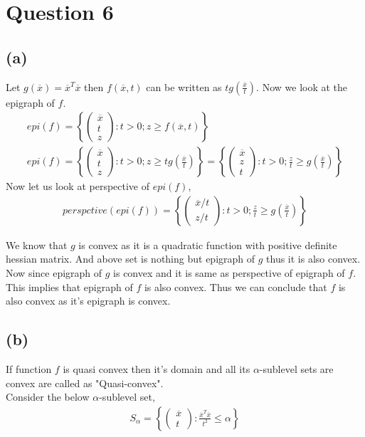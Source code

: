 \documentclass{article}
\begin{document}
\section*{\hfil Question 6}
\subsection*{(a)}
Let $g(\overline{x}) = \overline{x}^T\overline{x}$ then $f(\overline{x}, t)$ can be written as $tg(\frac{\overline{x}}{t})$. Now we look at the epigraph of $f$.
\begin{gather*}
	epi(f) = \left\{\begin{pmatrix}
	\overline{x}\\
	t\\
	z
	\end{pmatrix} : t > 0; z \ge f(\overline{x}, t)\right\}\\
	epi(f) = \left\{\begin{pmatrix}
	\overline{x}\\
	t\\
	z
	\end{pmatrix} : t > 0; z \ge tg\left(\frac{\overline{x}}{t}\right)\right\} = \left\{\begin{pmatrix}
	\overline{x}\\
	z\\
	t
	\end{pmatrix} : t > 0; \frac{z}{t} \ge g\left(\frac{\overline{x}}{t}\right)\right\}
\end{gather*}
Now let us look at perspective of $epi(f)$,
\begin{gather*}
perspctive(epi(f)) = \left\{\begin{pmatrix}
	\overline{x}/t\\
	z/t
	\end{pmatrix} : t > 0; \frac{z}{t} \ge g\left(\frac{\overline{x}}{t}\right)\right\}
\end{gather*}

We know that $g$ is convex as it is a quadratic function with positive definite hessian matrix. And above set is nothing but epigraph of $g$ thus it is also convex. Now since epigraph of $g$ is convex and it is same as perspective of epigraph of $f$. This implies that epigraph of $f$ is also convex. Thus we can conclude that $f$ is also convex as it's epigraph is convex.
\subsection*{(b)}
If function $f$ is quasi convex then it's domain and all its $\alpha$-sublevel sets are convex are called as "Quasi-convex".\\
Consider the below $\alpha$-sublevel set,
\begin{gather*}
	S_{\alpha} = \left\{\begin{pmatrix}
	\overline{x}\\
	t
	\end{pmatrix}: \frac{\overline{x}^T\overline{x}}{t^2} \le \alpha \right\}
\end{gather*}
\end{document}
